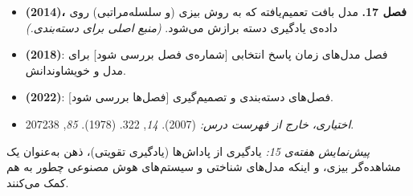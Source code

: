 \begin{itemize}
\tightlist
\item
  \textbf{ \lr{\&}  (2014)، فصل 17.} مدل بافت
  تعمیم‌یافته که به روش بیزی (و سلسله‌مراتبی) روی داده‌ی یادگیری دسته برازش
  می‌شود. \emph{(منبع اصلی برای دسته‌بندی.)}
\item
  \textbf{ \lr{\&}  (2018)}: فصل مدل‌های زمان پاسخ
  انتخابی {[}شماره‌ی فصل بررسی شود{]} برای مدل  و
  خویشاوندانش.
\item
  \textbf{ (2022)}: فصل‌های دسته‌بندی و تصمیم‌گیری {[}فصل‌ها
  بررسی شود{]}.
\item
  \emph{اختیاری، خارج از فهرست درس:}  \lr{\&}  (2007). 
  \emph{ \lr{\&}  14}, 3\lr{--}22.  \lr{\&}  (1978).  \emph{ 85},
  207\lr{--}238.
\end{itemize}

\emph{پیش‌نمایش هفته‌ی 15:} یادگیری از پاداش‌ها (یادگیری تقویتی)، ذهن
به‌عنوان یک مشاهده‌گر بیزی، و اینکه مدل‌های شناختی و سیستم‌های هوش مصنوعی
چطور به هم کمک می‌کنند.
